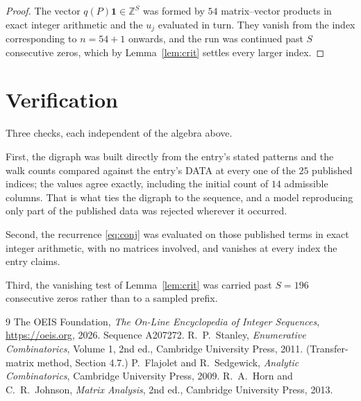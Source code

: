 \documentclass[11pt,a4paper]{article}
\theoremstyle{plain}
\theoremstyle{definition}
\begin{document}
\begin{proof}
The vector $q(P)\mathbf{1}\in\mathbb{Z}^{S}$ was formed by $54$ matrix--vector
products in exact integer arithmetic and the $u_j$ evaluated in turn. They vanish from the
index corresponding to $n=54+1$ onwards, and the run was continued past $S$ consecutive
zeros, which by Lemma~\ref{lem:crit} settles every larger index.
\end{proof}

\section{Verification}

Three checks, each independent of the algebra above.

First, the digraph was built directly from the entry's stated patterns and the walk counts
compared against the entry's DATA at every one of the $25$ published indices; the
values agree exactly, including the initial count of $14$ admissible columns. That is
what ties the digraph to the sequence, and a model reproducing only part of the published
data was rejected wherever it occurred.

Second, the recurrence \eqref{eq:conj} was evaluated on those published terms in exact
integer arithmetic, with no matrices involved, and vanishes at every index the entry claims.

Third, the vanishing test of Lemma~\ref{lem:crit} was carried past $S=196$ consecutive
zeros rather than to a sampled prefix.

\begin{thebibliography}{9}
 The OEIS Foundation, \emph{The On-Line Encyclopedia of Integer
Sequences}, \url{https://oeis.org}, 2026. Sequence A207272.
 R.~P.~Stanley, \emph{Enumerative Combinatorics}, Volume 1, 2nd ed.,
Cambridge University Press, 2011. (Transfer-matrix method, Section 4.7.)
 P.~Flajolet and R.~Sedgewick, \emph{Analytic Combinatorics}, Cambridge
University Press, 2009.
 R.~A.~Horn and C.~R.~Johnson, \emph{Matrix Analysis}, 2nd ed., Cambridge
University Press, 2013.
\end{thebibliography}
\end{document}

